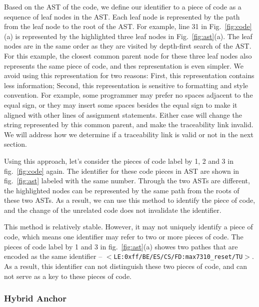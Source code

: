 Based on the AST of the code, we define our identifier to a piece of code as a sequence of leaf nodes in the AST. Each leaf node is represented by the path from the leaf node to the root of the AST. For example, line 31 in Fig.~\ref{fig:code}(a) is represented by the highlighted three leaf nodes in Fig.~\ref{fig:ast}(a). The leaf nodes are in the same order as they are visited by depth-first search of the AST. For this example, the closest common parent node for these three leaf nodes also represents the same piece of code, and thes representation is even simpler. We avoid using this representation for two reasons: First, this representation contains less information; Second, this representation is sensitive to formatting and style convention. For example, some programmer may prefer no spaces adjacent to the equal sign, or they may insert some spaces besides the equal sign to make it aligned with other lines of assignment statements. Either case will change the string represented by this common parent, and make the traceability link invalid. We will address how we determine if a traceability link is valid or not in the next section.

Using this approach, let's consider the pieces of code label by 1, 2 and 3 in fig.~\ref{fig:code} again. The identifier for these code pieces in AST are shown in fig.~\ref{fig:ast} labeled with the same number.
Through the two ASTs are different, 
the highlighted nodes can be represented by the same path from the roots of these two ASTs.
As a result, we can use this method to identify the piece of code, and the change of the unrelated code does not invalidate the identifier.

This method is relatively stable.
However, it may not uniquely identify a piece of code,
which means one identifier may refer to two or more pieces of code.
The pieces of code label by 1 and 3 in fig.~\ref{fig:ast}(a) showes two pathes that are encoded as the same identifier -- $<$\texttt{LE:0xff/BE/ES/CS/FD:max7310\_reset/TU}$>$.
As a result, this identifier can not distinguish these two pieces of code, 
and can not serve as a key to these pieces of code.

\subsubsection{Hybrid Anchor}

